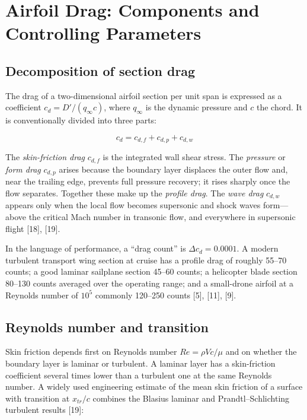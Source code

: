 \documentclass[10pt,a4paper,twocolumn]{article}
\begin{document}
\hypertarget{airfoil-drag-components-and-controlling-parameters}{%
\section{Airfoil Drag: Components and Controlling
Parameters}\label{airfoil-drag-components-and-controlling-parameters}}

\hypertarget{decomposition-of-section-drag}{%
\subsection{Decomposition of section
drag}\label{decomposition-of-section-drag}}

The drag of a two-dimensional airfoil section per unit span is expressed
as a coefficient \(c_d = D'/(q_\infty c)\), where \(q_\infty\) is the
dynamic pressure and \(c\) the chord. It is conventionally divided into
three parts:

\[c_d = c_{d,f} + c_{d,p} + c_{d,w} \tag{1}\]

The \emph{skin-friction drag} \(c_{d,f}\) is the integrated wall shear
stress. The \emph{pressure} or \emph{form drag} \(c_{d,p}\) arises
because the boundary layer displaces the outer flow and, near the
trailing edge, prevents full pressure recovery; it rises sharply once
the flow separates. Together these make up the \emph{profile drag}. The
\emph{wave drag} \(c_{d,w}\) appears only when the local flow becomes
supersonic and shock waves form---above the critical Mach number in
transonic flow, and everywhere in supersonic flight {[}18{]}, {[}19{]}.

In the language of performance, a ``drag count'' is
\(\Delta c_d = 0.0001\). A modern turbulent transport wing section at
cruise has a profile drag of roughly 55--70 counts; a good laminar
sailplane section 45--60 counts; a helicopter blade section 80--130
counts averaged over the operating range; and a small-drone airfoil at a
Reynolds number of \(10^5\) commonly 120--250 counts {[}5{]}, {[}11{]},
{[}9{]}.

\hypertarget{reynolds-number-and-transition}{%
\subsection{Reynolds number and
transition}\label{reynolds-number-and-transition}}

Skin friction depends first on Reynolds number \(Re = \rho V c/\mu\) and
on whether the boundary layer is laminar or turbulent. A laminar layer
has a skin-friction coefficient several times lower than a turbulent one
at the same Reynolds number. A widely used engineering estimate of the
mean skin friction of a surface with transition at \(x_{tr}/c\) combines
the Blasius laminar and Prandtl--Schlichting turbulent results {[}19{]}:
\end{document}
